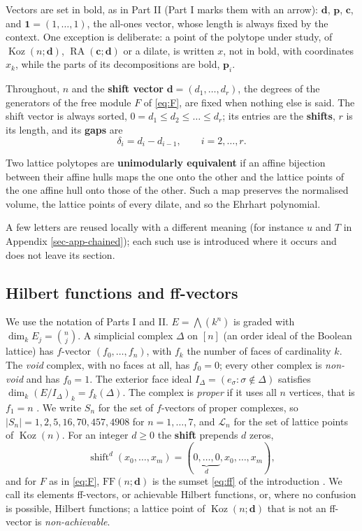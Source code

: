 \documentclass[11pt, a4paper, abstract=yes]{scrartcl}
\theoremstyle{definition}
\theoremstyle{remark}
\theoremstyle{plain}
\newcommand{\vek}[1]{\boldsymbol{#1}}
\theoremstyle{remark}
\theoremstyle{plain}
\newcommand{\Koz}{\operatorname{Koz}}
\newcommand{\shift}{\operatorname{shift}}
\newcommand{\RA}{\operatorname{RA}}
\newcommand{\FF}{\mathrm{FF}}
\let\autocite\cite
\begin{document}
Vectors are set in bold, as in Part II \autocite{SnellmanArticle2} (Part I marks them with an arrow):
\(\vek d\), \(\vek p\), \(\vek c\), and \(\vek 1=(1,\dots,1)\), the all-ones vector, whose length is
always fixed by the context. One exception is deliberate: a point of the polytope under study, of
\(\Koz(n;\vek d)\), \(\RA(\vek c;\vek d)\) or a dilate, is written \(x\), not in bold, with
coordinates \(x_k\), while the parts of its decompositions are bold, \(\vek p_i\).

Throughout, \(n\) and the \textbf{shift vector} \(\vek d=(d_1,\dots,d_r)\), the degrees of the generators of
the free module \(F\) of \eqref{eq:F}, are fixed when nothing else is said. The shift vector is always sorted,
\(0=d_1\le d_2\le\dots\le d_r\); its entries are the \textbf{shifts}, \(r\) is its length, and its \textbf{gaps}
are
\begin{equation}\label{eq:gaps}
  \delta_i=d_i-d_{i-1},\qquad i=2,\dots,r .
\end{equation}

Two lattice polytopes are \textbf{unimodularly equivalent} if an affine bijection between their affine hulls
maps the one onto the other and the lattice points of the one affine hull onto those of the other.
Such a map preserves the normalised volume, the lattice points of every dilate, and so the Ehrhart
polynomial.

A few letters are reused locally with a different meaning (for instance \(u\) and \(T\) in
Appendix \ref{sec-app-chained}); each such use is introduced where it occurs and does not leave its
section.
\subsection{Hilbert functions and ff-vectors}
\label{sec:org9dbff0e}

We use the notation of Parts I and II. \(E=\bigwedge(k^n)\) is graded with
\(\dim_kE_j=\binom nj\). A simplicial complex \(\Delta\) on \([n]\) (an order ideal of the Boolean
lattice) has \(f\)-vector \((f_0,\dots,f_n)\), with \(f_k\) the number of faces of cardinality
\(k\). The \emph{void} complex, with no faces at all, has \(f_0=0\); every other complex is \emph{non-void}
and has \(f_0=1\). The exterior face ideal
\(I_\Delta=(e_\sigma:\sigma\notin\Delta)\) satisfies \(\dim_k(E/I_\Delta)_k=f_k(\Delta)\). The
complex is \emph{proper} if it uses all \(n\) vertices, that is \(f_1=n\)
\autocite[Definition 10]{SnellmanArticle1}. We write \(S_n\) for the set of \(f\)-vectors of proper
complexes, so \(\lvert S_n\rvert=1,2,5,16,70,457,4908\) for \(n=1,\dots,7\), and \(\mathcal L_n\)
for the set of lattice points of \(\Koz(n)\). For an integer \(d\ge0\) the \textbf{shift} prepends \(d\)
zeros,
\begin{equation}\label{eq:shift}
  \shift^d(x_0,\dots,x_m)=(\underbrace{0,\dots,0}_{d},x_0,\dots,x_m),
\end{equation}
and for \(F\) as in \eqref{eq:F}, \(\FF(n;\vek d)\) is the sumset \eqref{eq:ff} of the introduction
\autocite[Proposition 35]{SnellmanArticle1}. We call its elements ff-vectors, or achievable Hilbert
functions, or, where no confusion is possible, Hilbert functions; a lattice point of
\(\Koz(n;\vek d)\) that is not an ff-vector is \emph{non-achievable}.
\end{document}
